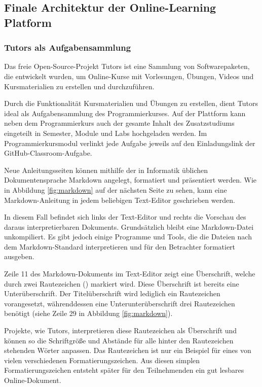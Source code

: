 \subsection{Finale Architektur der Online-Learning Platform}
\subsubsection{Tutors als Aufgabensammlung}\label{finale-architektur-tutors}
Das freie Open-Source-Projekt Tutors ist eine Sammlung von Softwarepaketen,
die entwickelt wurden, um Online-Kurse mit Vorlesungen, Übungen, Videos und
Kursmaterialien zu erstellen und durchzuführen. \parencite{tutors}

Durch die Funktionalität Kursmaterialien und Übungen zu erstellen, dient Tutors
ideal als Aufgabensammlung des Programmierkurses. Auf der Plattform kann neben
dem Programmierkurs auch der gesamte Inhalt des Zusatzstudiums eingeteilt in
Semester, Module und Labs hochgeladen werden. Im Programmierkursmodul verlinkt
jede Aufgabe jeweils auf den Einladungslink der GitHub-Classroom-Aufgabe.

Neue Anleitungsseiten können mithilfe der in Informatik üblichen
Dokumentensprache Markdown angelegt, formatiert und präsentiert werden. Wie in
Abbildung \ref{fig:markdown} auf der nächsten Seite zu sehen, kann eine 
Markdown-Anleitung in jedem beliebigen Text-Editor geschrieben werden.

In diesem Fall befindet sich links der Text-Editor und rechts die Vorschau des
daraus interpretierbaren Dokuments. Grundsätzlich bleibt eine Markdown-Datei
unkompiliert. Es gibt jedoch einige Programme und Tools, die die Dateien
nach dem Markdown-Standard interpretieren und für den Betrachter formatiert
ausgeben.

Zeile 11 des Markdown-Dokuments im Text-Editor zeigt eine Überschrift, welche
durch zwei Rautezeichen (\code{\#\#}) markiert wird. Diese Überschrift ist
bereits eine Unterüberschrift. Der Titelüberschrift wird lediglich ein
Rautezeichen vorangesetzt, währenddessen eine Unterunterüberschrift drei
Rautezeichen benötigt (siehe Zeile 29 in Abbildung \ref{fig:markdown}).

Projekte, wie Tutors, interpretieren diese Rautezeichen als Überschrift und
können so die Schriftgröße und Abstände für alle hinter den Rautezeichen
stehenden Wörter anpassen. Das Rautezeichen ist nur ein Beispiel für eines von
vielen verschiedenen Formatierungszeichen. Aus diesen simplen
Formatierungszeichen entsteht später für den Teilnehmenden ein gut lesbares
Online-Dokument. \parencite{markdown}

